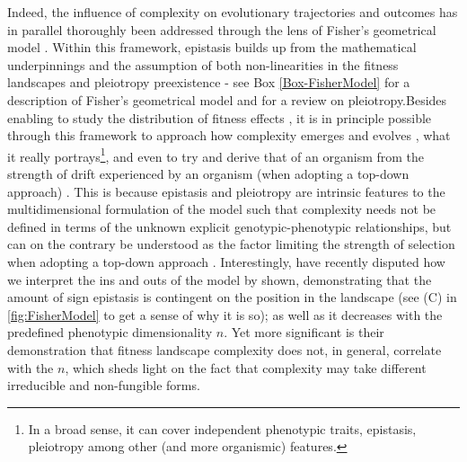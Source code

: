 Indeed, the influence of complexity on evolutionary trajectories and outcomes has in parallel thoroughly been addressed through the lens of Fisher's geometrical model \citep{Fisher30,Orr98,Orr00,Poon00,Martin06,Tenaillon07,Sella09,Tenaillon14}. Within this framework, epistasis builds up from the mathematical underpinnings \citep{Hartl96,Orr00,Tenaillon14,Hwang17} and the assumption of both non-linearities in the fitness landscapes\citep{Hwang17} and pleiotropy preexistence \citep{Tenaillon14} - see Box \ref{Box-FisherModel} for a description of Fisher's geometrical model and \citep{Stearns10} for a review on pleiotropy.Besides enabling to study the distribution of fitness effects \citep{Martin06,Lourenco11}, it is in principle possible through this framework to approach how complexity emerges and evolves \citep{Orr98,Martin07,Gros09,Le-Nagard11}, what it really portrays\footnote{In a broad sense, it can cover independent phenotypic traits, epistasis, pleiotropy among other (and more organismic) features.}, and even to try and derive that of an organism from the strength of drift experienced by an organism (when adopting a top-down approach) \citep{Tenaillon07}. This is because epistasis and pleiotropy are intrinsic features to the multidimensional formulation of the model \citep{Tenaillon14} such that complexity needs not be defined in terms of the unknown explicit genotypic-phenotypic relationships, but can on the contrary be understood as the factor limiting the strength of selection when adopting a top-down approach \citep{Le-Nagard11}. Interestingly, \citet{Hwang17} have recently disputed how we interpret the ins and outs of the model by shown, demonstrating that the amount of sign epistasis is contingent on the position in the landscape (see (C) in \ref{fig:FisherModel} to get a sense of why it is so); as well as it decreases with the predefined phenotypic dimensionality $n$. Yet more significant is their demonstration that fitness landscape complexity does not, in general, correlate with the $n$, which sheds light on the fact that complexity may take different irreducible and non-fungible forms.

